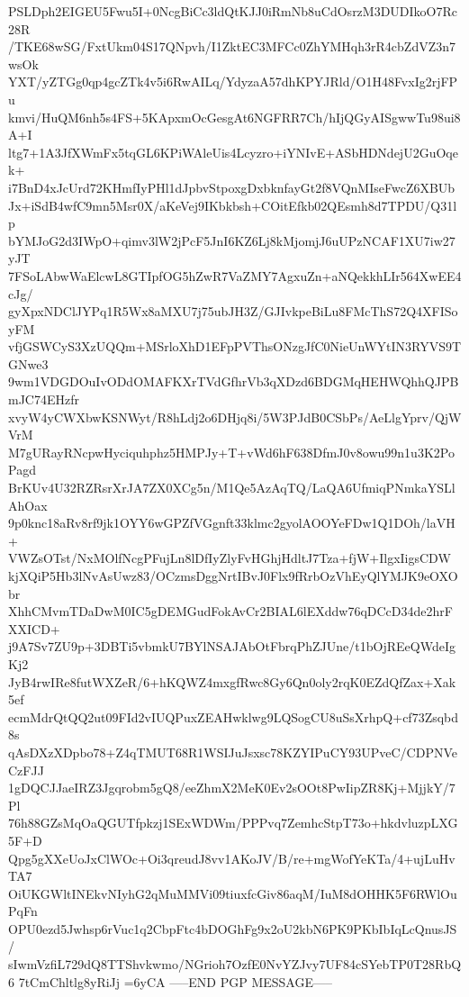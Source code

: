 PSLDph2EIGEU5Fwu5I+0NcgBiCc3ldQtKJJ0iRmNb8uCdOsrzM3DUDIkoO7Rc28R
/TKE68wSG/FxtUkm04S17QNpvh/I1ZktEC3MFCc0ZhYMHqh3rR4cbZdVZ3n7wsOk
YXT/yZTGg0qp4gcZTk4v5i6RwAILq/YdyzaA57dhKPYJRld/O1H48FvxIg2rjFPu
kmvi/HuQM6nh5s4FS+5KApxmOcGesgAt6NGFRR7Ch/hIjQGyAISgwwTu98ui8A+I
ltg7+1A3JfXWmFx5tqGL6KPiWAleUis4Lcyzro+iYNIvE+ASbHDNdejU2GuOqek+
i7BnD4xJcUrd72KHmfIyPHl1dJpbvStpoxgDxbknfayGt2f8VQnMIseFwcZ6XBUb
Jx+iSdB4wfC9mn5Msr0X/aKeVej9IKbkbsh+COitEfkb02QEsmh8d7TPDU/Q31lp
bYMJoG2d3IWpO+qimv3lW2jPcF5JnI6KZ6Lj8kMjomjJ6uUPzNCAF1XU7iw27yJT
7FSoLAbwWaElcwL8GTIpfOG5hZwR7VaZMY7AgxuZn+aNQekkhLIr564XwEE4cJg/
gyXpxNDClJYPq1R5Wx8aMXU7j75ubJH3Z/GJIvkpeBiLu8FMcThS72Q4XFISoyFM
vfjGSWCyS3XzUQQm+MSrloXhD1EFpPVThsONzgJfC0NieUnWYtIN3RYVS9TGNwe3
9wm1VDGDOuIvODdOMAFKXrTVdGfhrVb3qXDzd6BDGMqHEHWQhhQJPBmJC74EHzfr
xvyW4yCWXbwKSNWyt/R8hLdj2o6DHjq8i/5W3PJdB0CSbPs/AeLlgYprv/QjWVrM
M7gURayRNcpwHyciquhphz5HMPJy+T+vWd6hF638DfmJ0v8owu99n1u3K2PoPagd
BrKUv4U32RZRsrXrJA7ZX0XCg5n/M1Qe5AzAqTQ/LaQA6UfmiqPNmkaYSLlAhOax
9p0knc18aRv8rf9jk1OYY6wGPZfVGgnft33klmc2gyolAOOYeFDw1Q1DOh/laVH+
VWZsOTst/NxMOlfNcgPFujLn8lDfIyZlyFvHGhjHdltJ7Tza+fjW+IlgxIigsCDW
kjXQiP5Hb3lNvAsUwz83/OCzmsDggNrtIBvJ0Flx9fRrbOzVhEyQlYMJK9eOXObr
XhhCMvmTDaDwM0IC5gDEMGudFokAvCr2BIAL6lEXddw76qDCcD34de2hrFXXICD+
j9A7Sv7ZU9p+3DBTi5vbmkU7BYlNSAJAbOtFbrqPhZJUne/t1bOjREeQWdeIgKj2
JyB4rwIRe8futWXZeR/6+hKQWZ4mxgfRwc8Gy6Qn0oly2rqK0EZdQfZax+Xak5ef
ecmMdrQtQQ2ut09FId2vIUQPuxZEAHwklwg9LQSogCU8uSsXrhpQ+cf73Zsqbd8s
qAsDXzXDpbo78+Z4qTMUT68R1WSIJuJsxsc78KZYIPuCY93UPveC/CDPNVeCzFJJ
1gDQCJJaeIRZ3Jgqrobm5gQ8/eeZhmX2MeK0Ev2sOOt8PwIipZR8Kj+MjjkY/7Pl
76h88GZsMqOaQGUTfpkzj1SExWDWm/PPPvq7ZemhcStpT73o+hkdvluzpLXG5F+D
Qpg5gXXeUoJxClWOc+Oi3qreudJ8vv1AKoJV/B/re+mgWofYeKTa/4+ujLuHvTA7
OiUKGWltINEkvNIyhG2qMuMMVi09tiuxfcGiv86aqM/IuM8dOHHK5F6RWlOuPqFn
OPU0ezd5Jwhsp6rVuc1q2CbpFtc4bDOGhFg9x2oU2kbN6PK9PKbIbIqLcQnusJS/
sIwmVzfiL729dQ8TTShvkwmo/NGrioh7OzfE0NvYZJvy7UF84cSYebTP0T28RbQ6
7tCmChltlg8yRiJj
=6yCA
-----END PGP MESSAGE-----
